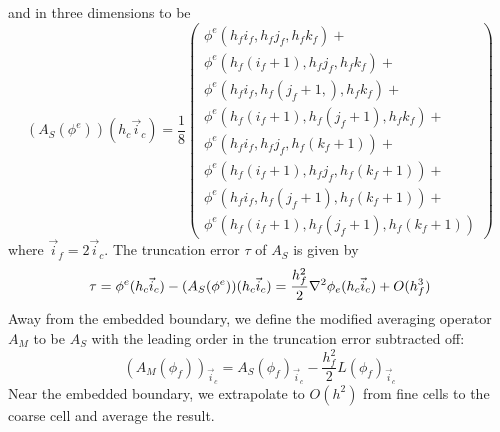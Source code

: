and in three dimensions to be
\begin{equation}        
(A_S(\phi^e))(h_c \vec i_c) = \frac{1}{8}\left( \begin{array}{ll}
\phi^e(h_f i_f   ,h_f j_f, h_f k_f) + \\
\phi^e(h_f(i_f+1),h_f j_f, h_f k_f) + \\ 
\phi^e(h_f i_f   ,h_f(j_f+1,), h_f k_f) + \\
\phi^e(h_f(i_f+1),h_f(j_f+1), h_f k_f)  + \\
\phi^e(h_f i_f   ,h_f j_f, h_f(k_f+1)) + \\
\phi^e(h_f(i_f+1),h_f j_f, h_f(k_f+1)) + \\ 
\phi^e(h_f i_f   ,h_f(j_f+1), h_f(k_f+1)) + \\
\phi^e(h_f(i_f+1),h_f(j_f+1), h_f(k_f+1))
\end{array} \right)
\end{equation}
where $\vec i_f = 2 \vec i_c$.
The truncation error $\tau$ of $A_S$ is given by
\begin{equation}
\tau = \phi^e(h_c \vec i_c)-(A_S(\phi^e))(h_c \vec i_c) =
\frac{h^2_f}{2} \nabla^2 \phi_e(h_c \vec i_c) + O(h^3_f)
\end{equation}
Away from the embedded boundary,
we define the modified averaging operator $A_M$ to be
$A_S$ with the leading order in the truncation error subtracted off:
\begin{equation}
(A_M(\phi_f))_{\vec i_c} = 
        A_S(\phi_f)_{\vec i_c} - \frac{h^2_f}{2} L(\phi_f)_{\vec i_c}
\label{MODAVERAGE}        
\end{equation}
Near the embedded boundary, we extrapolate to $O(h^2)$ from fine cells
to the coarse cell and average the result.

